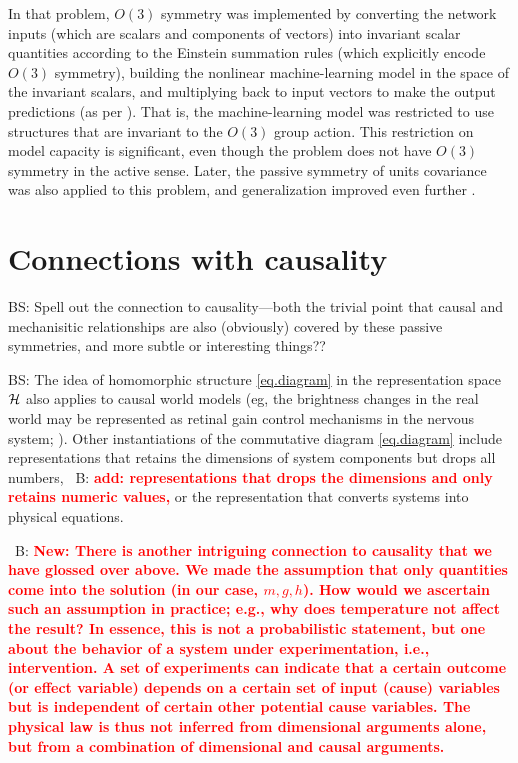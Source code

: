 \documentclass{article}
\theoremstyle{plain}
\theoremstyle{definition}
\theoremstyle{remark}
\newcommand{\bernhard}[1]{~B: \textcolor{red}{\textbf{#1}}}
\begin{document}
In that problem, $O(3)$ symmetry was implemented by converting the network inputs (which are scalars and components of vectors) into invariant scalar quantities according to the Einstein summation rules (which explicitly encode $O(3)$ symmetry), building the nonlinear machine-learning model in the space of the invariant scalars, and multiplying back to input vectors to make the output predictions (as per \citealt{villar2021scalars}).
That is, the machine-learning model was restricted to use structures that are invariant to the $O(3)$ group action.
This restriction on model capacity is significant, even though the problem does not have $O(3)$ symmetry in the active sense.
Later, the passive symmetry of units covariance was also applied to this problem, and generalization improved even further \cite{villar2022dimensionless}.

\section{Connections with causality}\label{sec:causality}

BS: Spell out the connection to causality---both the trivial point that causal and mechanisitic relationships are also (obviously) covered by these passive symmetries, and more subtle or interesting things??

BS: The idea of homomorphic structure \eqref{eq.diagram} in the representation space $\cal H$ also applies to causal world models (eg, the brightness changes in the real world may be represented as retinal gain control mechanisms in the nervous system; \citealt{1911.10500}).
 Other instantiations of the commutative diagram \eqref{eq.diagram} include representations that retains the dimensions of system components but drops all numbers, \bernhard{add: representations that drops the dimensions and only retains numeric values,} or the representation that converts systems into physical equations.

\bernhard{New: There is another intriguing connection to causality that we have glossed over above.
We made the assumption that only quantities come into the solution (in our case, $m, g, h$). How would we ascertain such an assumption in practice; e.g., why does temperature not affect the result? In essence, this is not a probabilistic statement, but one about the behavior of a system under experimentation, i.e., intervention. A set of experiments can indicate that a certain outcome (or effect variable) depends on a certain set of input (cause) variables but is independent of certain other potential cause variables. The physical law is thus not inferred from dimensional arguments alone, but from a combination of dimensional and causal arguments.}
\end{document}

